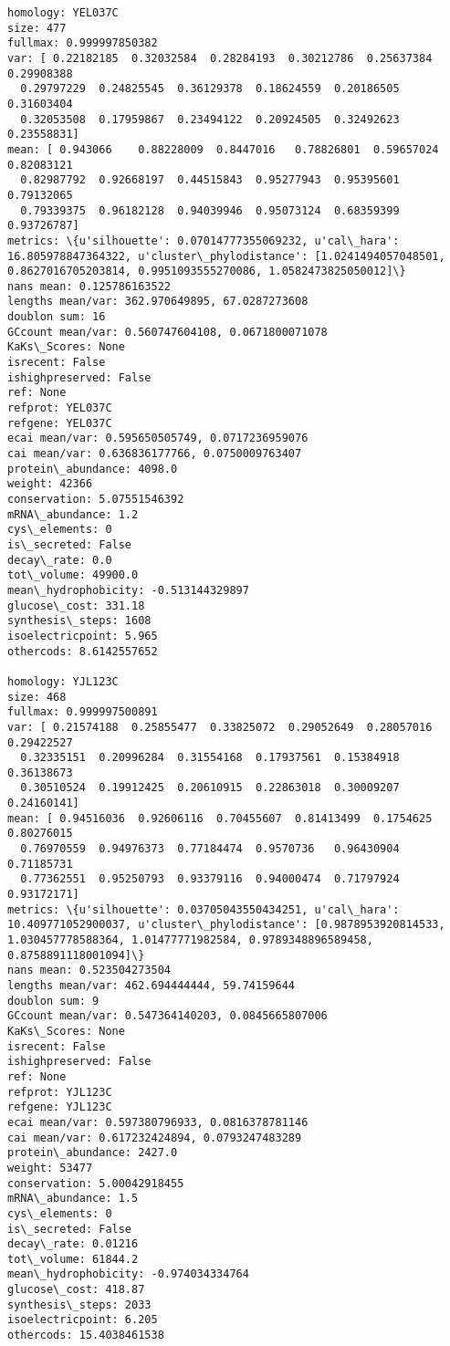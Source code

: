 \documentclass[11pt]{article}
\begin{document}
\begin{Verbatim}[commandchars=\\\{\}]
homology: YEL037C
size: 477
fullmax: 0.999997850382
var: [ 0.22182185  0.32032584  0.28284193  0.30212786  0.25637384  0.29908388
  0.29797229  0.24825545  0.36129378  0.18624559  0.20186505  0.31603404
  0.32053508  0.17959867  0.23494122  0.20924505  0.32492623  0.23558831]
mean: [ 0.943066    0.88228009  0.8447016   0.78826801  0.59657024  0.82083121
  0.82987792  0.92668197  0.44515843  0.95277943  0.95395601  0.79132065
  0.79339375  0.96182128  0.94039946  0.95073124  0.68359399  0.93726787]
metrics: \{u'silhouette': 0.07014777355069232, u'cal\_hara': 16.805978847364322, u'cluster\_phylodistance': [1.0241494057048501, 0.8627016705203814, 0.9951093555270086, 1.0582473825050012]\}
nans mean: 0.125786163522
lengths mean/var: 362.970649895, 67.0287273608
doublon sum: 16
GCcount mean/var: 0.560747604108, 0.0671800071078
KaKs\_Scores: None
isrecent: False
ishighpreserved: False
ref: None
refprot: YEL037C
refgene: YEL037C
ecai mean/var: 0.595650505749, 0.0717236959076
cai mean/var: 0.636836177766, 0.0750009763407
protein\_abundance: 4098.0
weight: 42366
conservation: 5.07551546392
mRNA\_abundance: 1.2
cys\_elements: 0
is\_secreted: False
decay\_rate: 0.0
tot\_volume: 49900.0
mean\_hydrophobicity: -0.513144329897
glucose\_cost: 331.18
synthesis\_steps: 1608
isoelectricpoint: 5.965
othercods: 8.6142557652

homology: YJL123C
size: 468
fullmax: 0.999997500891
var: [ 0.21574188  0.25855477  0.33825072  0.29052649  0.28057016  0.29422527
  0.32335151  0.20996284  0.31554168  0.17937561  0.15384918  0.36138673
  0.30510524  0.19912425  0.20610915  0.22863018  0.30009207  0.24160141]
mean: [ 0.94516036  0.92606116  0.70455607  0.81413499  0.1754625   0.80276015
  0.76970559  0.94976373  0.77184474  0.9570736   0.96430904  0.71185731
  0.77362551  0.95250793  0.93379116  0.94000474  0.71797924  0.93172171]
metrics: \{u'silhouette': 0.03705043550434251, u'cal\_hara': 10.409771052900037, u'cluster\_phylodistance': [0.9878953920814533, 1.030457778588364, 1.01477771982584, 0.9789348896589458, 0.8758891118001094]\}
nans mean: 0.523504273504
lengths mean/var: 462.694444444, 59.74159644
doublon sum: 9
GCcount mean/var: 0.547364140203, 0.0845665807006
KaKs\_Scores: None
isrecent: False
ishighpreserved: False
ref: None
refprot: YJL123C
refgene: YJL123C
ecai mean/var: 0.597380796933, 0.0816378781146
cai mean/var: 0.617232424894, 0.0793247483289
protein\_abundance: 2427.0
weight: 53477
conservation: 5.00042918455
mRNA\_abundance: 1.5
cys\_elements: 0
is\_secreted: False
decay\_rate: 0.01216
tot\_volume: 61844.2
mean\_hydrophobicity: -0.974034334764
glucose\_cost: 418.87
synthesis\_steps: 2033
isoelectricpoint: 6.205
othercods: 15.4038461538


\end{Verbatim}
\end{document}
